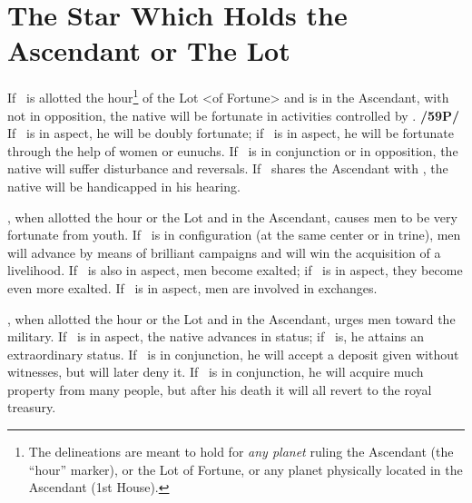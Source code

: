 \section{The Star Which Holds the Ascendant or The Lot}
If  \Saturn\, is allotted the hour\footnote{The delineations are meant to hold for \textit{any planet} ruling the Ascendant (the ``hour'' marker), or the Lot of Fortune, or any planet physically located in the Ascendant (1st House).} of the Lot <of Fortune> and is in the Ascendant, with \Mars\, not in opposition, the native will be fortunate in activities controlled by \Saturn. \textbf{/59P/} If \Jupiter\, is in aspect, he will be doubly fortunate; if \Venus\, is in aspect, he will be fortunate through the help of women or eunuchs. If \Mars\, is in conjunction or in opposition, the native will suffer disturbance and reversals. If \Mercury\,
shares the Ascendant with \Saturn, the native will be handicapped in his hearing.

\Jupiter, when allotted the hour or the Lot and in the Ascendant, causes men to be very fortunate from youth. If \Mars\, is in configuration (at the same center or in trine), men will advance by means of brilliant campaigns and will win the acquisition of a livelihood. If \Saturn\, is also in aspect, men become exalted; if \Venus\, is in aspect, they become even more exalted. If \Mercury\, is in aspect, men are involved in exchanges.

\Mars, when allotted the hour or the Lot and in the Ascendant, urges men toward the military. If \Jupiter\, is in aspect, the native advances in status; if \Venus\, is, he attains an extraordinary status. If \Mercury\, is in conjunction, he will accept a deposit given without witnesses, but will later deny it. If \Jupiter\, is in conjunction, he will acquire much property from many people, but after his death it will all revert to the royal treasury.

